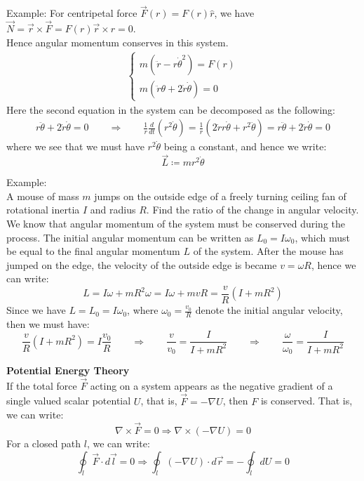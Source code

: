 \documentclass[11pt,oneside]{book}
\theoremstyle{break}
\theoremstyle{break}
\newcommand{\example}{\color{green}Example: \color{black}}
\begin{document}
\example
For centripetal force $\vec{F}(r) = F(r)\hat{r}$, we have $\vec{N} = \vec{r}\times \vec{F} = F(r) \vec{r}\times \hat{r} = 0$. \\Hence angular momentum conserves in this system.
\begin{align*}
\begin{cases}
m(\ddot{r} - r\dot{\theta}^2) = F(r)\\
m(\ddot{r}\theta + 2\dot{r}\dot{\theta})=0
\end{cases}
\end{align*}
Here the second equation in the system can be decomposed as the following:
\begin{align*}
r\ddot{\theta}+2\dot{r}\dot{\theta} = 0 \qquad \Rightarrow \qquad \frac{1}{r} \frac{d}{dt}(r^2\dot{\theta}) = \frac{1}{r}(2\dot{r}r\dot{\theta}+r^2\ddot{\theta}) = r\ddot{\theta}+2\dot{r}\dot{\theta}=0
\end{align*}
where we see that we must have $r^2 \dot{\theta} $ being a constant, and hence we write:
$$\vec{L}\coloneqq mr^2\dot{\theta}$$


\example \\
A mouse of mass $m$ jumps on the outside edge of a freely turning ceiling fan of rotational inertia $I$ and radius $R$. Find the ratio of the change in angular velocity.\\

We know that angular momentum of the system must be conserved during the process. The initial angular momentum can be written as $L_0 = I \omega_0$, which must be equal to the final angular momentum $L$ of the system. After the mouse has jumped on the edge, the velocity of the outside edge is became $v = \omega R$, hence we can write:
$$L = I\omega + mR^2 \omega =I\omega + mvR = \frac{v}{R}(I + mR^2)$$
Since we have $L= L_0 = I\omega_0$, where $\omega_0 = \frac{v_0}{R}$ denote the initial angular velocity, then we must have:
$$\frac{v}{R}(I + mR^2) = I\frac{v_0}{R} \qquad \Rightarrow \qquad \frac{v}{v_0} = \frac{I}{I+mR^2}\qquad \Rightarrow \qquad \frac{\omega}{\omega_0} = \frac{I}{I+mR^2}$$

\newpage
\textbf{Potential Energy Theory}\\
If the total force $\vec{F}$ acting on a system appears as the negative gradient of a single valued scalar potential $U$, that is, $\vec{F} = -\nabla U$, then $F$ is conserved. That is, we can write:
$$\nabla \times \vec{F} = 0 \Rightarrow \nabla\times (-\nabla U) = 0$$
For a closed path $l$, we can write:
$$\oint_l \vec{F}\cdot d\vec{l} = 0 \Rightarrow \oint_l (-\nabla U)\cdot d\vec{r} = -\oint_l dU = 0$$
\end{document}
